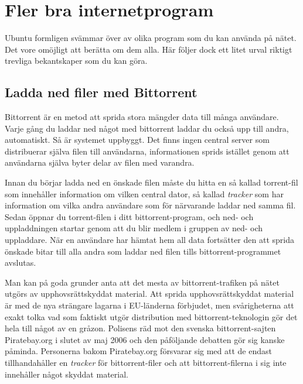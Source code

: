 \documentclass[a4paper,final]{memoir} %
\begin{document}

\section{Fler bra internetprogram}

Ubuntu formligen svämmar över av olika program som du kan använda på nätet. Det vore omöjligt att berätta om dem alla. Här följer dock ett litet urval riktigt trevliga bekantskaper som du kan göra.


\subsection{Ladda ned filer med Bittorrent}

Bittorrent är en metod att sprida stora mängder data till många användare. Varje gång du laddar ned något med bittorrent laddar du också upp till andra, automatiskt. Så är systemet uppbyggt. Det finns ingen central server som distribuerar själva filen till användarna, informationen sprids istället genom att användarna själva byter delar av filen med varandra. 

Innan du börjar ladda ned en önskade filen måste du hitta en så kallad torrent-fil som innehåller information om vilken central dator, så kallad \textit{tracker} som har information om vilka andra användare som för närvarande laddar ned samma fil. Sedan öppnar du torrent-filen i ditt bittorrent-program, och ned- och uppladdningen startar genom att du blir medlem i gruppen av ned- och uppladdare. När en användare har hämtat hem all data fortsätter den att sprida önskade bitar till alla andra som laddar ned filen tills bittorrent-programmet avslutas.

Man kan på goda grunder anta att det mesta av bittorrent-trafiken på nätet utgörs av upphovsrättskyddat material. Att sprida upphovsrättskyddat material är med de nya strängare lagarna i EU-länderna förbjudet, men svårigheterna att exakt tolka vad som faktiskt utgör distribution med bittorrent-teknologin gör det hela till något av en gråzon. Polisens räd mot den svenska bittorrent-sajten Piratebay.org i slutet av maj 2006 och den påföljande debatten gör sig kanske påminda. Personerna bakom Piratebay.org försvarar sig med att de endast tillhandahåller en \textit{tracker} för bittorrent-filer och att bittorrent-filerna i sig inte innehåller något skyddat material.
\end{document}
